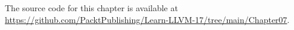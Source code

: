 
The source code for this chapter is available at \url{https://github.com/PacktPublishing/Learn-LLVM-17/tree/main/Chapter07}.